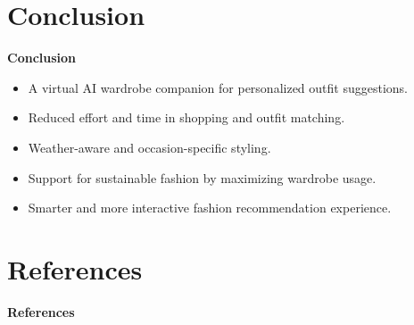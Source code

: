\documentclass[11pt,aspectratio=169,notes,mathserif]{beamer}
\begin{document}
\section{Conclusion}
\begin{frame}{\textbf{Conclusion}}
\begin{itemize}
	\item A virtual AI wardrobe companion for personalized outfit suggestions.
	\item Reduced effort and time in shopping and outfit matching.
	\item Weather-aware and occasion-specific styling.
	\item Support for sustainable fashion by maximizing wardrobe usage.
	\item Smarter and more interactive fashion recommendation experience.
\end{itemize}
\end{frame}

\nocite{Sarkar_2023_WACV}
\nocite{kalashi2025hybrid}
\nocite{sulthana2021review}
\nocite{pandit2020review_clothes_matching}
\nocite{b_r2025ai_virtual_clothing}
\nocite{fathima2024fashion_fusion}
\nocite{patel2024smart_fashion_rf}
\nocite{kumar2025virtual_wardrobe_ar}

\section{References}
\begin{frame}[allowframebreaks]{\textbf{References}}
    \footnotesize
    
    
\end{frame}
\end{document}
